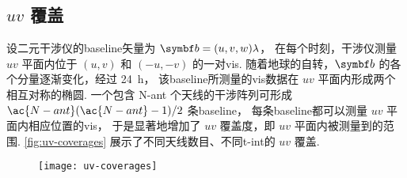 \subsection{\texorpdfstring{$uv$}{uv} 覆盖}
\label{sec:uv-coverage}

设二元干涉仪的\ac{baseline}矢量为 $\B{b} = (u,v,w)\lambda$，
在每个时刻，干涉仪测量 $uv$ 平面内位于 $(u,v)$ 和 $(-u,-v)$ 的一对\ac{vis}.
随着地球的自转，$\B{b}$ 的各个分量逐渐变化，经过 \SI{24}{\hour}，
该\ac{baseline}所测量的\ac{vis}数据在 $uv$ 平面内形成两个相互对称的椭圆.
一个包含 \ac{N-ant} 个天线的干涉阵列可形成
$\ac{N-ant}(\ac{N-ant}-1)/2$ 条\ac{baseline}，
每条\ac{baseline}都可以测量 $uv$ 平面内相应位置的\ac{vis}，
于是显著地增加了 $uv$ 覆盖度，即 $uv$ 平面内被测量到的范围.
\autoref{fig:uv-coverages} 展示了不同天线数目、不同\ac{t-int}的 $uv$ 覆盖.

\begin{figure}[htp]
  \centering
  \texttt{[image: uv-coverages]}
  \label{fig:uv-coverages}
\end{figure}

